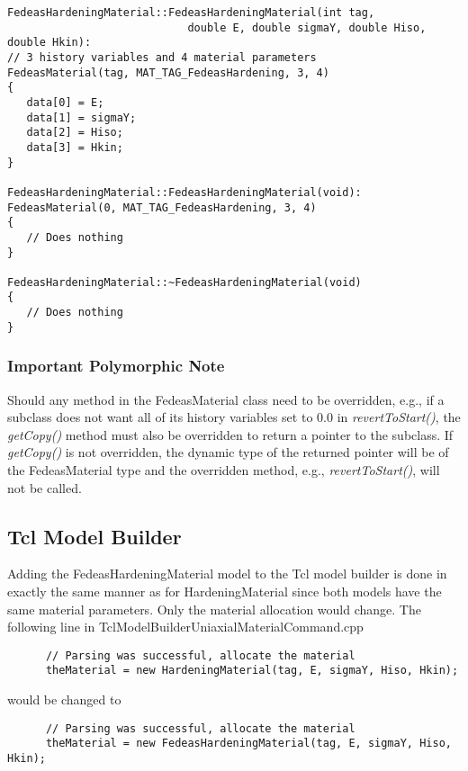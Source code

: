 \documentclass[12pt]{article}
\begin{document}
{\sf\small
\begin{verbatim}
FedeasHardeningMaterial::FedeasHardeningMaterial(int tag,
                            double E, double sigmaY, double Hiso, double Hkin):
// 3 history variables and 4 material parameters
FedeasMaterial(tag, MAT_TAG_FedeasHardening, 3, 4)
{
   data[0] = E;
   data[1] = sigmaY;
   data[2] = Hiso;
   data[3] = Hkin;
}

FedeasHardeningMaterial::FedeasHardeningMaterial(void):
FedeasMaterial(0, MAT_TAG_FedeasHardening, 3, 4)
{
   // Does nothing
}

FedeasHardeningMaterial::~FedeasHardeningMaterial(void)
{
   // Does nothing
}
\end{verbatim}
}

\subsubsection{Important Polymorphic Note}
Should any method in the FedeasMaterial class need to be overridden, e.g., if a
subclass does not want all of its history variables set to $0.0$ in {\em revertToStart()},
the {\em getCopy()} method must also be overridden to return a pointer to the
subclass. If {\em getCopy()} is not overridden, the dynamic type of the returned
pointer will be of the FedeasMaterial type and the overridden method, e.g.,
{\em revertToStart()}, will not be called.

\subsection{Tcl Model Builder}
Adding the FedeasHardeningMaterial model to the Tcl model builder is done in exactly the same
manner as for HardeningMaterial since both models have the same material parameters. Only the
material allocation would change. The following line in TclModelBuilderUniaxialMaterialCommand.cpp

{\sf\small
\begin{verbatim}
      // Parsing was successful, allocate the material
      theMaterial = new HardeningMaterial(tag, E, sigmaY, Hiso, Hkin); 
\end{verbatim}
}

\noindent would be changed to

{\sf\small
\begin{verbatim}
      // Parsing was successful, allocate the material
      theMaterial = new FedeasHardeningMaterial(tag, E, sigmaY, Hiso, Hkin); 
\end{verbatim}
}
\end{document}
